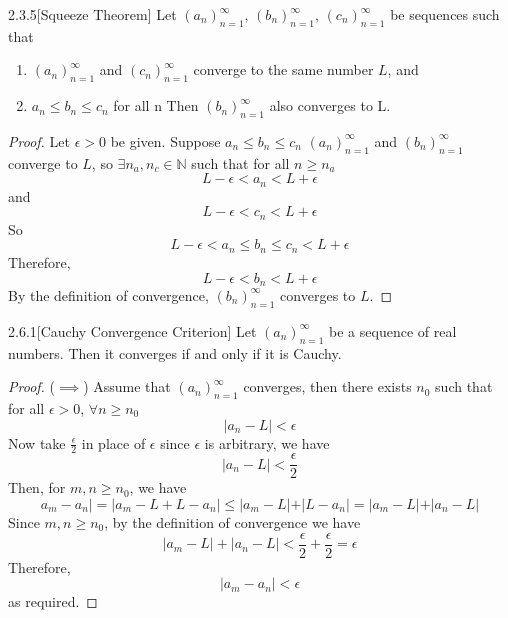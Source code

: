 \documentclass[openany]{report}
\begin{document}
    \begin{manualtheorem}{2.3.5}[Squeeze Theorem]
    Let $(a_n)_{n=1}^\infty$, $(b_n)_{n=1}^\infty$, $(c_n)_{n=1}^\infty$ be sequences such that 
    \begin{enumerate}[label=(\roman*)]
        \item $(a_n)_{n=1}^\infty$ and $(c_n)_{n=1}^\infty$ converge to the same number $L$, and 
        \item $a_n \leq b_n \leq c_n$ for all n
        Then $(b_n)_{n=1}^\infty$ also converges to L.
    \end{enumerate}
    \end{manualtheorem}
    \begin{proof}
        Let $\epsilon > 0$ be given. Suppose $a_n \leq b_n \leq c_n$ $(a_n)_{n=1}^\infty$ and $(b_n)_{n=1}^\infty$ converge to $L$, so $\exists n_a, n_c \in \mathbb{N}$ such that for all $n \geq n_a$
        \[L - \epsilon < a_n < L + \epsilon\]
        and 
        \[L - \epsilon < c_n < L + \epsilon\]
        So 
        \[L - \epsilon < a_n \leq b_n \leq c_n < L + \epsilon\]
        Therefore,
        \[L - \epsilon < b_n < L + \epsilon\]
        By the definition of convergence, $(b_n)_{n=1}^\infty$ converges to $L$.
    \end{proof}
    \begin{manualtheorem}{2.6.1}[Cauchy Convergence Criterion]
    Let $(a_n)_{n=1}^\infty$ be a sequence of real numbers. Then it converges if and only if it is Cauchy.
    \end{manualtheorem}
    \begin{proof}
        ($\implies$) Assume that $(a_n)_{n=1}^\infty$ converges, then there exists $n_0$ such that for all $\epsilon > 0$,  $\forall n \geq n_0$
        \[|a_n - L| < \epsilon\]
        Now take $\frac{\epsilon}{2}$ in place of $\epsilon$ since $\epsilon$ is arbitrary, we have
        \[|a_n - L| < \frac{\epsilon}{2}\]
        Then, for $m,n \geq n_0$, we have 
        \[a_m - a_n| = |a_m - L + L - a_n| \leq |a_m - L| + |L - a_n| = |a_m - L| + |a_n - L|\]
        Since $m, n \geq n_0$, by the definition of convergence we have
        \[|a_m - L| + |a_n - L| < \frac{\epsilon}{2} + \frac{\epsilon}{2} = \epsilon\]
        Therefore,
        \[|a_m - a_n| < \epsilon\]
        as required.
        
    \end{proof}
\end{document}
